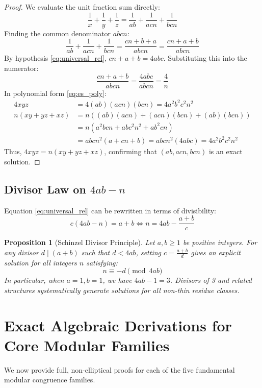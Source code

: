\documentclass[11pt,a4paper]{article}
\newtheorem{proposition}[theorem]{Proposition}
\theoremstyle{definition}
\begin{document}
\begin{proof}
We evaluate the unit fraction sum directly:
\[ \frac{1}{x} + \frac{1}{y} + \frac{1}{z} = \frac{1}{a b} + \frac{1}{a c n} + \frac{1}{b c n} \]
Finding the common denominator $a b c n$:
\[ \frac{1}{a b} + \frac{1}{a c n} + \frac{1}{b c n} = \frac{c n + b + a}{a b c n} = \frac{c n + a + b}{a b c n} \]
By hypothesis \eqref{eq:universal_rel}, $c n + a + b = 4 a b c$. Substituting this into the numerator:
\[ \frac{c n + a + b}{a b c n} = \frac{4 a b c}{a b c n} = \frac{4}{n} \]
In polynomial form \eqref{eq:es_poly}:
\begin{align*}
4 x y z &= 4 (a b) (a c n) (b c n) = 4 a^2 b^2 c^2 n^2 \\
n (x y + y z + x z) &= n \left( (a b)(a c n) + (a c n)(b c n) + (a b)(b c n) \right) \\
&= n \left( a^2 b c n + a b c^2 n^2 + a b^2 c n \right) \\
&= a b c n^2 (a + c n + b) = a b c n^2 (4 a b c) = 4 a^2 b^2 c^2 n^2
\end{align*}
Thus, $4 x y z = n (x y + y z + x z)$, confirming that $(a b, a c n, b c n)$ is an exact solution.
\end{proof}

\subsection{Divisor Law on \texorpdfstring{$4ab - n$}{4ab - n}}

Equation \eqref{eq:universal_rel} can be rewritten in terms of divisibility:
\[ c(4ab - n) = a + b \iff n = 4ab - \frac{a+b}{c} \]
\begin{proposition}[Schinzel Divisor Principle]\label{prop:schinzel_div}
Let $a, b \ge 1$ be positive integers. For any divisor $d \mid (a+b)$ such that $d < 4ab$, setting $c = \frac{a+b}{d}$ gives an explicit solution for all integers $n$ satisfying:
\[ n \equiv -d \pmod{4ab} \]
In particular, when $a=1, b=1$, we have $4ab - 1 = 3$. Divisors of 3 and related structures systematically generate solutions for all non-thin residue classes.
\end{proposition}

\section{Exact Algebraic Derivations for Core Modular Families}

We now provide full, non-elliptical proofs for each of the five fundamental modular congruence families.
\end{document}
